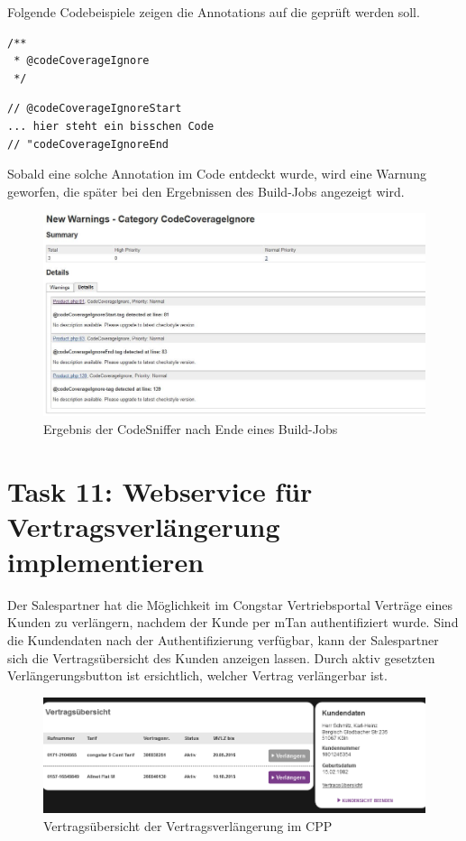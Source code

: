 \documentclass[11pt,a4paper]{article}
\begin{document}
Folgende Codebeispiele zeigen die Annotations auf die geprüft werden soll.

\begin{lstlisting} 
/**
 * @codeCoverageIgnore
 */
\end{lstlisting} 

\begin{lstlisting} 
// @codeCoverageIgnoreStart
... hier steht ein bisschen Code
// "codeCoverageIgnoreEnd
\end{lstlisting} 

Sobald eine solche Annotation im Code entdeckt wurde, wird eine Warnung geworfen, die später bei den Ergebnissen des Build-Jobs angezeigt wird.

\begin{figure}[t]
\includegraphics[width=\textwidth]{images/resultSniffer.JPG}
\caption{Ergebnis der CodeSniffer nach Ende eines Build-Jobs \cite{aoe}}
\centering
\end{figure}




\section{Task 11: Webservice für Vertragsverlängerung implementieren}

Der Salespartner hat die Möglichkeit im Congstar Vertriebsportal Verträge eines
Kunden zu verlängern, nachdem der Kunde per mTan authentifiziert wurde. 
Sind die Kundendaten nach der Authentifizierung verfügbar, kann der Salespartner 
sich die Vertragsübersicht des Kunden anzeigen lassen. Durch aktiv gesetzten 
Verlängerungsbutton ist ersichtlich, welcher Vertrag verlängerbar ist.

\begin{figure}[h]
\includegraphics[width=\textwidth]{images/vertragsubersicht.png}
\caption{Vertragsübersicht der Vertragsverlängerung im CPP \cite{congstarv}}
\centering
\end{figure}
\end{document}
